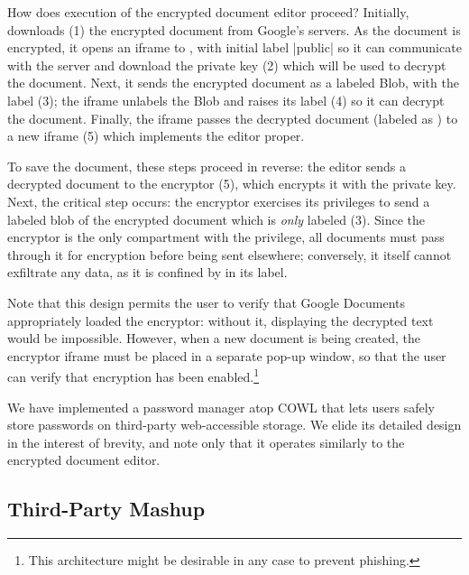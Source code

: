 How does execution of the encrypted document editor proceed?
%
Initially,  downloads (1) the encrypted document from
Google's servers.
%
As the document is encrypted, it opens an iframe to
, with initial label 
\js|public| so it can communicate with the  server and
download the private key (2) which will be used to decrypt the document.
%
Next, it sends the encrypted document as a labeled Blob, with the label
 (3); the iframe unlabels the Blob and
raises its label (4) so it can decrypt the document.
%
Finally, the iframe passes the decrypted document (labeled as
) to a new iframe (5) which
implements the editor proper.

To save the document, these steps proceed in reverse: the editor sends
a decrypted document to the encryptor (5), which encrypts it with the
private key.  Next, the critical step occurs: the encryptor exercises
its privileges to send a labeled blob of the encrypted document which
is \emph{only} labeled  (3).  Since the
encryptor is the only compartment with the  privilege,
all documents must pass through it for encryption before being sent
elsewhere; conversely, it itself cannot exfiltrate any data, as it is
confined by  in its label.

Note that this design permits the user to verify that Google Documents
appropriately loaded the encryptor: without it, displaying the
decrypted text would be impossible. However, when a new document is
being created, the encryptor iframe must be placed in a separate
pop-up window, so that the user can verify that encryption has been
enabled.\footnote{This architecture might be desirable in any case to
  prevent phishing.}

We have implemented a password manager atop COWL that lets users
safely store passwords on third-party web-accessible storage. We elide
its detailed design in the interest of brevity, and note only that it
operates similarly to the encrypted document editor.

\subsection{Third-Party Mashup}
\label{sec:apps-mashup}

